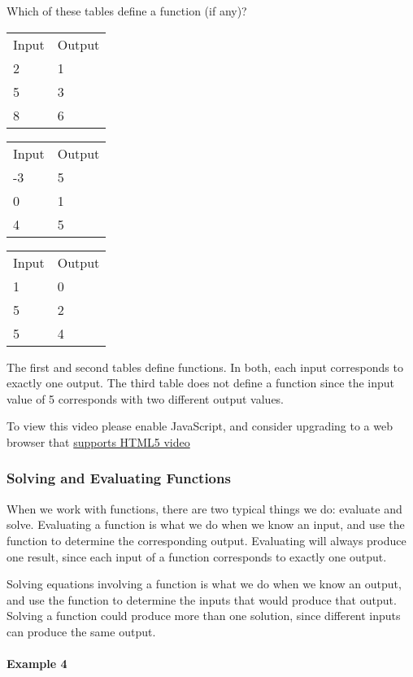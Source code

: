 Which of these tables define a function (if any)?

\begin{longtable}[]{@{}ll@{}}
\toprule
\endhead
Input & Output\tabularnewline
2 & 1\tabularnewline
5 & 3\tabularnewline
8 & 6\tabularnewline
\bottomrule
\end{longtable}

\begin{longtable}[]{@{}ll@{}}
\toprule
\endhead
Input & Output\tabularnewline
-3 & 5\tabularnewline
0 & 1\tabularnewline
4 & 5\tabularnewline
\bottomrule
\end{longtable}

\begin{longtable}[]{@{}ll@{}}
\toprule
\endhead
Input & Output\tabularnewline
1 & 0\tabularnewline
5 & 2\tabularnewline
5 & 4\tabularnewline
\bottomrule
\end{longtable}

The first and second tables define functions. In both, each input
corresponds to exactly one output. The third table does not define a
function since the input value of 5 corresponds with two different
output values.

To view this video please enable JavaScript, and consider upgrading to a
web browser that \href{http://videojs.com/html5-video-support/}{supports
HTML5 video}

\hypertarget{solving-and-evaluating-functions}{%
\subsubsection{Solving and Evaluating
Functions}\label{solving-and-evaluating-functions}}

When we work with functions, there are two typical things we do:
evaluate and solve. Evaluating a function is what we do when we know an
input, and use the function to determine the corresponding output.
Evaluating will always produce one result, since each input of a
function corresponds to exactly one output.

Solving equations involving a function is what we do when we know an
output, and use the function to determine the inputs that would produce
that output. Solving a function could produce more than one solution,
since different inputs can produce the same output.

\hypertarget{example-4}{%
\paragraph{Example 4}\label{example-4}}


